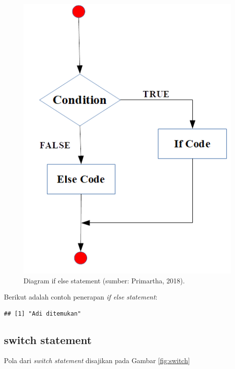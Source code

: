 \documentclass[]{book}
\newenvironment{Shaded}{\begin{snugshade}}{\end{snugshade}}
\newcommand{\KeywordTok}[1]{\textcolor[rgb]{0.13,0.29,0.53}{\textbf{#1}}}
\newcommand{\StringTok}[1]{\textcolor[rgb]{0.31,0.60,0.02}{#1}}
\newcommand{\ControlFlowTok}[1]{\textcolor[rgb]{0.13,0.29,0.53}{\textbf{#1}}}
\newcommand{\OperatorTok}[1]{\textcolor[rgb]{0.81,0.36,0.00}{\textbf{#1}}}
\newcommand{\NormalTok}[1]{#1}
\begin{document}
\begin{figure}

{\centering \includegraphics[width=0.4\linewidth]{ifelse} 

}

\caption{Diagram if else statement (sumber: Primartha, 2018).}\label{fig:ifelse}
\end{figure}

Berikut adalah contoh penerapan \emph{if else statement}:

\begin{Shaded}
\end{Shaded}

\begin{verbatim}
## [1] "Adi ditemukan"
\end{verbatim}

\subsection{switch statement}\label{switch-statement}

Pola dari \emph{switch statement} disajikan pada Gambar \ref{fig:switch}
\end{document}
